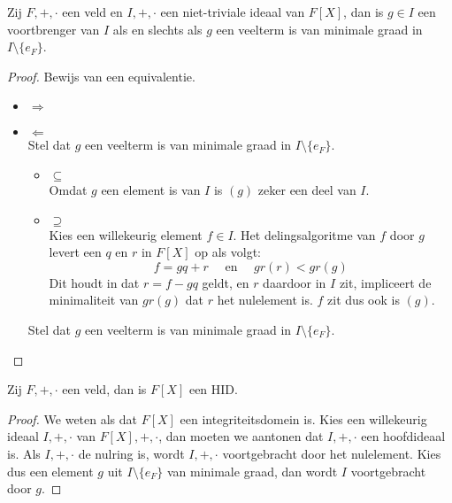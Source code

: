 \documentclass[main.tex]{subfiles}
\begin{document}
\begin{lem}
  \label{lem:minimale-veelterm-brengt-ideaal-voort}
  Zij $F,+,\cdot$ een veld en $I,+,\cdot$ een niet-triviale ideaal van $F[X]$, dan is $g\in I$ een voortbrenger van $I$ als en slechts als $g$ een veelterm is van minimale graad in $I\setminus \{e_{F}\}$.

  \begin{proof}
    Bewijs van een equivalentie.
    \begin{itemize}
    \item $\Rightarrow$\\
    \item $\Leftarrow$\\
      Stel dat $g$ een veelterm is van minimale graad in $I\setminus \{e_{F}\}$.
      \begin{itemize}
      \item $\subseteq$\\
        Omdat $g$ een element is van $I$ is $(g)$ zeker een deel van $I$.
      \item $\supseteq$\\
        Kies een willekeurig element $f\in I$.
        Het delingsalgoritme van $f$ door $g$ levert een $q$ en $r$ in $F[X]$ op als volgt:
        \[ f = gq + r \quad\text{ en }\quad gr(r) < gr(g) \]
        Dit houdt in dat $r=f-gq$ geldt, en $r$ daardoor in $I$ zit, impliceert de minimaliteit van $gr(g)$ dat $r$ het nulelement is.
        $f$ zit dus ook is $(g)$.
      \end{itemize}
      Stel dat $g$ een veelterm is van minimale graad in $I\setminus \{e_{F}\}$.
    \end{itemize}
  \end{proof}
\end{lem}

\begin{st}
  Zij $F,+,\cdot$ een veld, dan is $F[X]$ een HID.

  \begin{proof}
    We weten als dat $F[X]$ een integriteitsdomein is.
    Kies een willekeurig ideaal $I,+,\cdot$ van $F[X],+,\cdot$, dan moeten we aantonen dat $I,+,\cdot$ een hoofdideaal is.
    Als $I,+,\cdot$ de nulring is, wordt $I,+,\cdot$ voortgebracht door het nulelement.
    Kies dus een element $g$ uit $I\setminus \{e_{F}\}$ van minimale graad, dan wordt $I$ voortgebracht door $g$.
  \end{proof}
\end{st}
\end{document}
